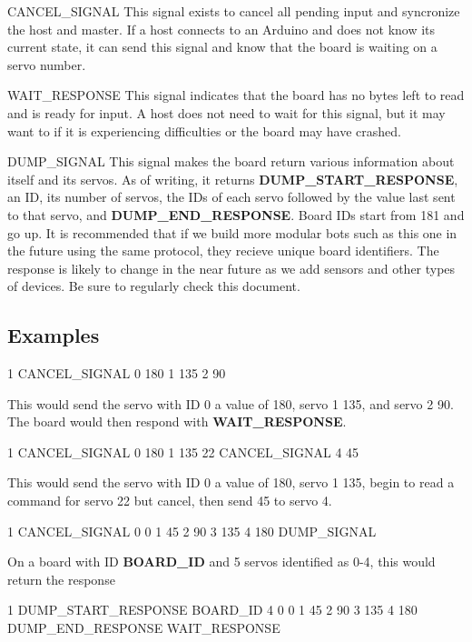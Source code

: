 \begin{DoxyParagraph}{C\+A\+N\+C\+E\+L\+\_\+\+S\+I\+G\+N\+A\+L}
This signal exists to cancel all pending input and syncronize the host and master. If a host connects to an Arduino and does not know its current state, it can send this signal and know that the board is waiting on a servo number.
\end{DoxyParagraph}
\begin{DoxyParagraph}{W\+A\+I\+T\+\_\+\+R\+E\+S\+P\+O\+N\+S\+E}
This signal indicates that the board has no bytes left to read and is ready for input. A host does not need to wait for this signal, but it may want to if it is experiencing difficulties or the board may have crashed.
\end{DoxyParagraph}
\begin{DoxyParagraph}{D\+U\+M\+P\+\_\+\+S\+I\+G\+N\+A\+L}
This signal makes the board return various information about itself and its servos. As of writing, it returns {\bfseries D\+U\+M\+P\+\_\+\+S\+T\+A\+R\+T\+\_\+\+R\+E\+S\+P\+O\+N\+S\+E}, an I\+D, its number of servos, the I\+Ds of each servo followed by the value last sent to that servo, and {\bfseries D\+U\+M\+P\+\_\+\+E\+N\+D\+\_\+\+R\+E\+S\+P\+O\+N\+S\+E}. Board I\+Ds start from 181 and go up. It is recommended that if we build more modular bots such as this one in the future using the same protocol, they recieve unique board identifiers. The response is likely to change in the near future as we add sensors and other types of devices. Be sure to regularly check this document.
\end{DoxyParagraph}
\hypertarget{index_Examples}{}\subsection{Examples}\label{index_Examples}

\begin{DoxyCode}
1 CANCEL\_SIGNAL 0 180 1 135 2 90
\end{DoxyCode}
 This would send the servo with I\+D 0 a value of 180, servo 1 135, and servo 2 90. The board would then respond with {\bfseries W\+A\+I\+T\+\_\+\+R\+E\+S\+P\+O\+N\+S\+E}. 
\begin{DoxyCode}
1 CANCEL\_SIGNAL 0 180 1 135 22 CANCEL\_SIGNAL 4 45
\end{DoxyCode}
 This would send the servo with I\+D 0 a value of 180, servo 1 135, begin to read a command for servo 22 but cancel, then send 45 to servo 4. 
\begin{DoxyCode}
1 CANCEL\_SIGNAL 0 0 1 45 2 90 3 135 4 180 DUMP\_SIGNAL
\end{DoxyCode}
 On a board with I\+D {\bfseries B\+O\+A\+R\+D\+\_\+\+I\+D} and 5 servos identified as 0-\/4, this would return the response 
\begin{DoxyCode}
1 DUMP\_START\_RESPONSE BOARD\_ID 4 0 0 1 45 2 90 3 135 4 180 DUMP\_END\_RESPONSE WAIT\_RESPONSE
\end{DoxyCode}
 
